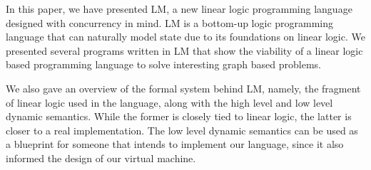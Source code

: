In this paper, we have presented LM, a new linear logic programming language designed with concurrency in mind. LM is a bottom-up logic programming language
that can naturally model state due to its foundations on linear logic.
We presented several programs written in LM that show the viability of a linear logic based programming language to solve interesting graph based problems.

We also gave an overview of the formal system behind LM, namely, the fragment of linear logic used in the language, along with the high level and low level dynamic semantics.
While the former is closely tied to linear logic, the latter is closer to a real implementation. The low level dynamic semantics can be used as a blueprint for someone that
intends to implement our language, since it also informed the design of our virtual machine.

